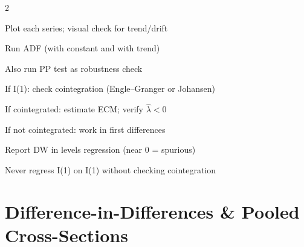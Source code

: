 \documentclass[10pt,a4paper]{article}
\begin{document}
\begin{tcolorbox}[checklist]
\begin{multicols}{2}
\begin{checklist}
  \item Plot each series; visual check for trend/drift
  \item Run ADF (with constant and with trend)
  \item Also run PP test as robustness check
  \item If I(1): check cointegration (Engle--Granger or Johansen)
  \item If cointegrated: estimate ECM; verify $\hat\lambda < 0$
  \item If not cointegrated: work in first differences
  \item Report DW in levels regression (near 0 = spurious)
  \item Never regress I(1) on I(1) without checking cointegration
\end{checklist}
\end{multicols}
\end{tcolorbox}

\newpage

\section{Difference-in-Differences \& Pooled Cross-Sections}
\end{document}
